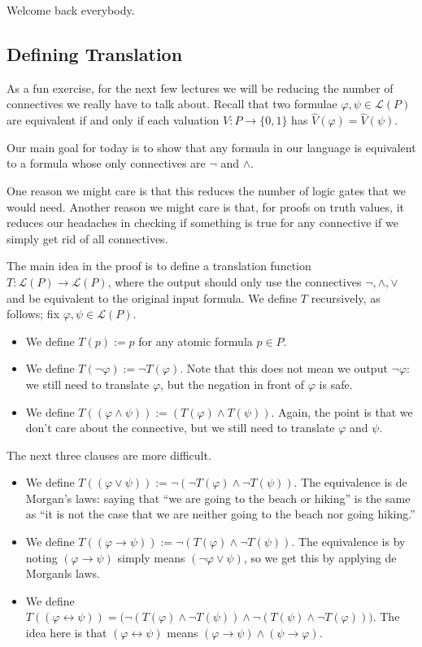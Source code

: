 
Welcome back everybody.

\subsection{Defining Translation}
As a fun exercise, for the next few lectures we will be reducing the number of connectives we really have to talk about. Recall that two formulae $\varphi,\psi\in\mathcal L(P)$ are equivalent if and only if each valuation $V:P\to\{0,1\}$ has $\hat V(\varphi)=\hat V(\psi)$.

Our main goal for today is to show that any formula in our language is equivalent to a formula whose only connectives are $\lnot$ and $\land$.
\begin{remark}
	One reason we might care is that this reduces the number of logic gates that we would need. Another reason we might care is that, for proofs on truth values, it reduces our headaches in checking if something is true for any connective if we simply get rid of all connectives.
\end{remark}
The main idea in the proof is to define a translation function $T:\mathcal L(P)\to\mathcal L(P)$, where the output should only use the connectives $\lnot,\land,\lor$ and be equivalent to the original input formula. We define $T$ recursively, as follows; fix $\varphi,\psi\in\mathcal L(P)$.
\begin{itemize}
	\item We define $T(p):=p$ for any atomic formula $p\in P$.
	\item We define $T(\lnot\varphi):=\lnot T(\varphi)$. Note that this does not mean we output $\lnot\varphi$: we still need to translate $\varphi$, but the negation in front of $\varphi$ is safe.
	\item We define $T((\varphi\land\psi)):=(T(\varphi)\land T(\psi))$. Again, the point is that we don't care about the connective, but we still need to translate $\varphi$ and $\psi$.
\end{itemize}
The next three clauses are more difficult.
\begin{itemize}
	\item We define $T((\varphi\lor\psi)):=\lnot(\lnot T(\varphi)\land\lnot T(\psi))$. The equivalence is de Morgan's laws: saying that ``we are going to the beach or hiking'' is the same as ``it is not the case that we are neither going to the beach nor going hiking.''
	\item We define $T((\varphi\to\psi)):=\lnot(T(\varphi)\land\lnot T(\psi))$. The equivalence is by noting $(\varphi\to\psi)$ simply means $(\lnot\varphi\lor\psi)$, so we get this by applying de Morganls laws.
	\item We define $T((\varphi\leftrightarrow\psi))=\big(\lnot(T(\varphi)\land\lnot T(\psi))\land\lnot(T(\psi)\land\lnot T(\varphi))\big)$. The idea here is that $(\varphi\leftrightarrow\psi)$ means $(\varphi\to\psi)\land(\psi\to\varphi)$.
\end{itemize}
